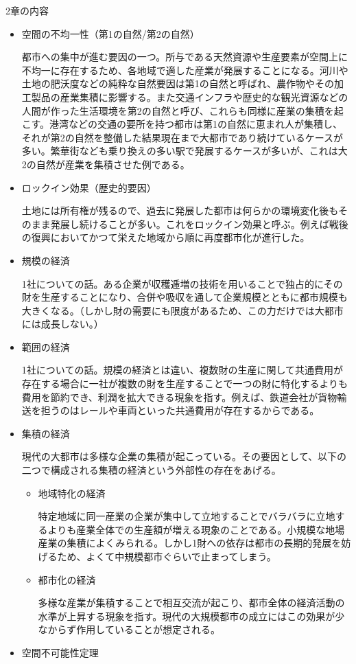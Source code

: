 \documentclass{jsarticle}
\begin{document}
2章の内容
\begin{itemize}
\item 空間の不均一性（第1の自然/第2の自然）

都市への集中が進む要因の一つ。所与である天然資源や生産要素が空間上に不均一に存在するため、各地域で適した産業が発展することになる。河川や土地の肥沃度などの純粋な自然要因は第1の自然と呼ばれ、農作物やその加工製品の産業集積に影響する。また交通インフラや歴史的な観光資源などの人間が作った生活環境を第2の自然と呼び、これらも同様に産業の集積を起こす。港湾などの交通の要所を持つ都市は第1の自然に恵まれ人が集積し、それが第2の自然を整備した結果現在まで大都市であり続けているケースが多い。繁華街なども乗り換えの多い駅で発展するケースが多いが、これは大2の自然が産業を集積させた例である。
\item ロックイン効果（歴史的要因）

土地には所有権が残るので、過去に発展した都市は何らかの環境変化後もそのまま発展し続けることが多い。これをロックイン効果と呼ぶ。例えば戦後の復興においてかつて栄えた地域から順に再度都市化が進行した。
\item 規模の経済

1社についての話。ある企業が収穫逓増の技術を用いることで独占的にその財を生産することになり、合併や吸収を通して企業規模とともに都市規模も大きくなる。（しかし財の需要にも限度があるため、この力だけでは大都市には成長しない。）
\item 範囲の経済

1社についての話。規模の経済とは違い、複数財の生産に関して共通費用が存在する場合に一社が複数の財を生産することで一つの財に特化するよりも費用を節約でき、利潤を拡大できる現象を指す。例えば、鉄道会社が貨物輸送を担うのはレールや車両といった共通費用が存在するからである。
\item 集積の経済

現代の大都市は多様な企業の集積が起こっている。その要因として、以下の二つで構成される集積の経済という外部性の存在をあげる。
	\begin{itemize}
	\item 地域特化の経済
	
	特定地域に同一産業の企業が集中して立地することでバラバラに立地するよりも産業全体での生産額が増える現象のことである。小規模な地場産業の集積によくみられる。しかし1財への依存は都市の長期的発展を妨げるため、よくて中規模都市ぐらいで止まってしまう。
	\item 都市化の経済
	
	多様な産業が集積することで相互交流が起こり、都市全体の経済活動の水準が上昇する現象を指す。現代の大規模都市の成立にはこの効果が少なからず作用していることが想定される。
	\end{itemize}
\item 空間不可能性定理


\end{itemize}
\end{document}

